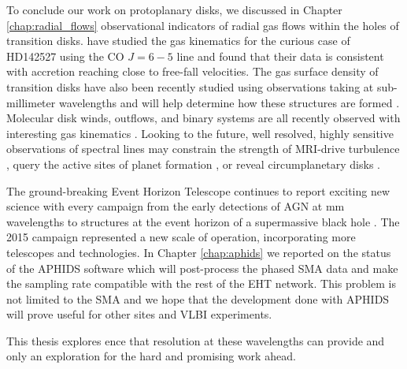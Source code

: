 To conclude our work on protoplanary disks, we discussed in Chapter \ref{chap:radial_flows} observational 
indicators of 
radial gas flows within the holes of transition disks.  \citet{casassus15} have studied the gas kinematics for
the curious case of HD142527 using the CO $J = 6-5$ line and found that their data is consistent with
accretion reaching close to free-fall velocities.  The gas surface density of transition disks have also 
been recently studied using observations taking at sub-millimeter wavelengths 
\citep{bruderer14,zhang14,canovas15,perez15,vandermarel15} and will help determine how these structures are formed
\citep{bruderer13}.  Molecular disk winds, outflows, and binary systems are all recently observed 
with interesting gas kinematics \citep{klaasen13,dutrey14,williams14,salyk14,czekala15}.  Looking to the 
future, well resolved, highly sensitive observations of spectral lines may constrain the strength of MRI-drive
turbulence \citep{simon15}, query the active sites of planet formation \citep{kleeves15,ober15}, or reveal
circumplanetary disks \citep{perez15}.

The ground-breaking Event Horizon Telescope continues to report exciting new science with every
campaign from the early detections of AGN at mm wavelengths \citep{doeleman05} to structures
at the event horizon of a supermassive black hole \citep{doeleman08,doeleman09,doeleman13}.
The 2015 campaign represented a new scale of operation, incorporating more telescopes and
technologies.  In Chapter \ref{chap:aphids} we reported on the status of the APHIDS software which
will post-process the phased SMA data and make the sampling rate compatible with the rest of the EHT
network.  This problem is not limited to the SMA and we hope that the development done with APHIDS will
prove useful for other sites and VLBI experiments. 

This thesis explores
ence that resolution at these wavelengths can provide and only an exploration for the 
hard and promising work ahead.  
